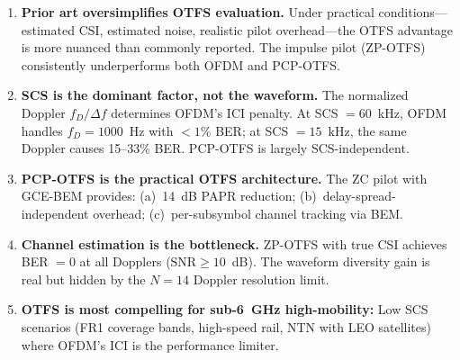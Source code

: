 \documentclass[11pt,a4paper,twoside]{article}
\begin{document}
\begin{enumerate}
    \item \textbf{Prior art oversimplifies OTFS evaluation.} Under practical conditions---estimated CSI, estimated noise, realistic pilot overhead---the OTFS advantage is more nuanced than commonly reported. The impulse pilot (ZP-OTFS) consistently underperforms both OFDM and PCP-OTFS.

    \item \textbf{SCS is the dominant factor, not the waveform.} The normalized Doppler $f_D / \Delta f$ determines OFDM's ICI penalty. At SCS $= 60$~kHz, OFDM handles $f_D = 1000$~Hz with $<1\%$ BER; at SCS $= 15$~kHz, the same Doppler causes 15--33\% BER. PCP-OTFS is largely SCS-independent.

    \item \textbf{PCP-OTFS is the practical OTFS architecture.} The ZC pilot with GCE-BEM provides: (a)~14~dB PAPR reduction; (b)~delay-spread-independent overhead; (c)~per-subsymbol channel tracking via BEM.

    \item \textbf{Channel estimation is the bottleneck.} ZP-OTFS with true CSI achieves BER $= 0$ at all Dopplers ($\text{SNR} \geq 10$~dB). The waveform diversity gain is real but hidden by the $N = 14$ Doppler resolution limit.

    \item \textbf{OTFS is most compelling for sub-6~GHz high-mobility:} Low SCS scenarios (FR1 coverage bands, high-speed rail, NTN with LEO satellites) where OFDM's ICI is the performance limiter.
\end{enumerate}
\end{document}
